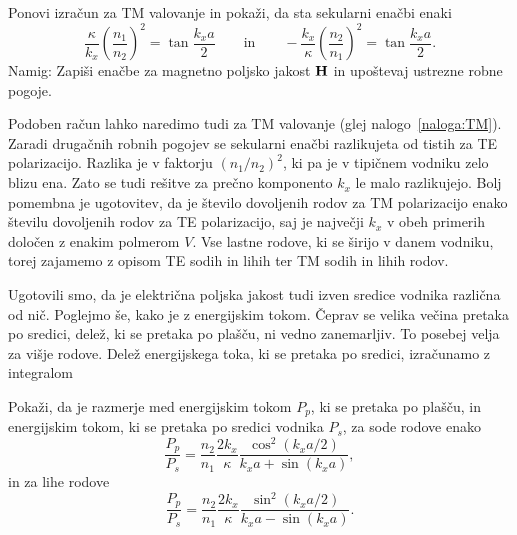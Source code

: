 \begin{definition}
\label{naloga:TM}
Ponovi izračun za TM valovanje in pokaži, da sta sekularni enačbi enaki 
\begin{equation}
\frac{\kappa}{k_x} \left(\frac{n_1}{n_2}\right)^2= 
\tan \frac{k_x a}{2} \qquad \mathrm{in} \qquad -\frac{k_x}{\kappa} \left(\frac{n_2}{n_1}\right)^2= 
\tan \frac{k_x a}{2}.
\end{equation}
Namig: Zapiši enačbe za magnetno poljsko jakost ${\bf H}$ in upoštevaj ustrezne robne pogoje.
\end{definition}

Podoben račun lahko naredimo tudi za TM valovanje (glej nalogo~\ref{naloga:TM}). Zaradi drugačnih
robnih pogojev se sekularni enačbi razlikujeta od tistih za TE polarizacijo. Razlika je v
faktorju $(n_1/n_2)^2$, ki pa je v tipičnem vodniku zelo blizu ena. Zato se tudi rešitve 
za prečno komponento $k_x$ le malo razlikujejo. Bolj pomembna je ugotovitev, da je število
dovoljenih rodov za TM polarizacijo enako številu dovoljenih rodov za TE polarizacijo, 
saj je največji $k_x$ v obeh primerih določen z enakim polmerom $V$. 
Vse lastne rodove, ki se širijo v danem vodniku, torej zajamemo z opisom TE sodih in lihih ter 
TM sodih in lihih rodov.

Ugotovili smo, da je električna poljska jakost tudi izven sredice vodnika različna od nič. 
Poglejmo še, kako je z energijskim tokom. Čeprav se velika večina pretaka po sredici, 
delež, ki se pretaka po plašču, ni vedno zanemarljiv. To posebej velja za višje rodove. 
Delež energijskega toka, ki se pretaka po sredici, izračunamo
z integralom
\begin{definition}
Pokaži, da je razmerje med energijskim tokom $P_p$, ki se pretaka po plašču, in energijskim tokom, 
ki se pretaka po sredici vodnika $P_s$, za sode rodove enako
\begin{equation}
\frac{P_p}{P_s}= \frac{n_2}{n_1}\frac{2 k_x}{\kappa} \frac{\cos^2(k_x a/2)}{k_xa + \sin(k_xa)},
\end{equation}
in za lihe rodove
\begin{equation}
\frac{P_p}{P_s}= \frac{n_2}{n_1}\frac{2 k_x}{\kappa} \frac{\sin^2(k_x a/2)}{k_xa - \sin(k_xa)}.
\end{equation}
\end{definition}

